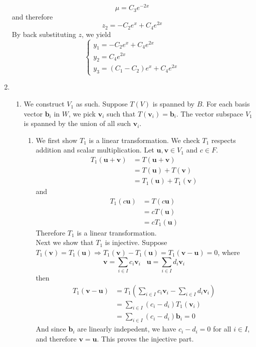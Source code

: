 \documentclass[12pt]{article}
\theoremstyle{definition}
\begin{document}
\begin{enumerate}
  \[
\mu = C_3e^{-2x}
  \] 
  and therefore
  \[
z_2 = -C_2e^x+C_4e^{2x}
  \]
  By back substituting $z$, we yield
  \[
\begin{cases}
y_1 = -C_2e^x+C_4e^{2x}\\
y_2 = C_4e^{2x}\\
y_3 = (C_1-C_2)e^x +C_4e^{2x}
\end{cases}
  \]
  \item %
  \begin{enumerate}
    \item We construct $V_1$ as such. Suppose $T(V)$ is spanned by $B$. For each basis vector $\mathbf{b}_i$ in $W$, we pick $\mathbf{v}_i$ such that $T(\mathbf{v}_i) =\mathbf{b}_i$. The vector subspace $V_1$ is spanned by the union of all such $\mathbf{v}_i$. 
    \begin{enumerate}
      \item We first show $T_1$ is a linear transformation. We check $T_1$ respects addition and scalar multiplication. Let $\mathbf{u},\mathbf{v}\in V_1$ and $c\in F$.
      \begin{align*}
T_1(\mathbf{u}+\mathbf{v}) &= T(\mathbf{u}+\mathbf{v}) \\
&=T(\mathbf{u})+T(\mathbf{v})\\
&=T_1(\mathbf{u})+T_1(\mathbf{v})
      \end{align*}
      and
      \begin{align*}
      T_1(c\mathbf{u}) &=T(c\mathbf{u})\\
      &=cT(\mathbf{u})\\
      &=cT_1(\mathbf{u})
      \end{align*}
      Therefore $T_1$ is a linear transformation.\\Next we show that $T_1$ is injective.
      Suppose $T_1(\mathbf{v}) = T_1(\mathbf{u})\Rightarrow T_1(\mathbf{v})-T_1(\mathbf{u}) = T_1(\mathbf{v}-\mathbf{u}) = 0$, where
      \[
      \mathbf{v} = \sum_{i\in I} c_i\mathbf{v}_i\;\;\;\mathbf{u} = \sum_{i\in I} d_i\mathbf{v}_i
      \]then
      \begin{align*}
T_1(\mathbf{v}-\mathbf{u}) &= T_1(\sum_{i\in I}c_i\mathbf{v}_i-\sum_{i\in I}d_i\mathbf{v}_i)\\&=\sum_{i\in I}(c_i-d_i)T_1(\mathbf{v}_i)\\&=\sum_{i\in I}(c_i-d_i)\mathbf{b}_i = 0
      \end{align*}
      And since $\mathbf{b}_i$ are linearly indepedent, we have $c_i-d_i = 0$ for all $i\in I$, and therefore $\mathbf{v} = \mathbf{u}$. This proves the injective part.

\end{enumerate}
\end{enumerate}
\end{enumerate}
\end{document}

